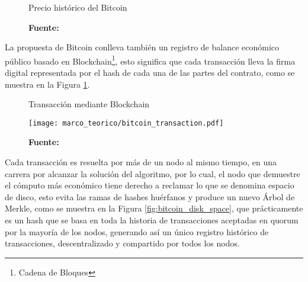 \documentclass[../main/main.tex]{subfiles}
\begin{document}
  \begin{figure}[H]
    \centering
    \caption{Precio histórico del Bitcoin}
    \newcommand\csvfile{../inc/marco_teorico/bitcoin_price.csv}
    \pgfplotstableread[col sep=comma]{\csvfile}\datatable
    \caption*{\textbf{Fuente:} \cite{web:bitstamp}}
  \end{figure}

  La propuesta de Bitcoin conlleva también un registro de balance económico público basado en Blockchain\footnote{Cadena de Bloques}, esto significa que cada transacción lleva la firma digital representada por el hash de cada una de las partes del contrato, como se muestra en la Figura \ref{fig:bitcoin_transaction}.

  \begin{figure}[ht]
    \centering
    \caption{Transacción mediante Blockchain}
    \texttt{[image: marco\_teorico/bitcoin\_transaction.pdf]}
    \caption*{\textbf{Fuente:} \cite[p.~2]{article:satoshi_bitcoin}}
    \label{fig:bitcoin_transaction}
  \end{figure}

  Cada transacción es resuelta por más de un nodo al mismo tiempo, en una carrera por alcanzar la solución del algoritmo, por lo cual, el nodo que demuestre el cómputo más económico tiene derecho a reclamar lo que se denomina espacio de disco, esto evita las ramas de hashes huérfanos y produce un nuevo Árbol de Merkle, como se muestra en la Figura \ref{fig:bitcoin_disk_space}, que prácticamente es un hash que se basa en toda la historia de transacciones aceptadas en quorum por la mayoría de los nodos, generando así un único registro histórico de transacciones, descentralizado y compartido por todos los nodos.
\end{document}
